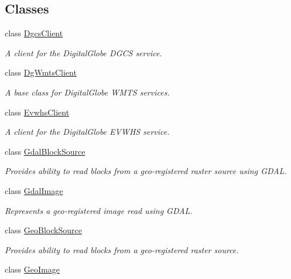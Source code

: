 \subsection*{Classes}
\begin{DoxyCompactItemize}
\item 
class \hyperlink{structdg_1_1deepcore_1_1imagery_1_1_dgcs_client}{Dgcs\+Client}
\begin{DoxyCompactList}\small\item\em A client for the Digital\+Globe D\+G\+CS service. \end{DoxyCompactList}\item 
class \hyperlink{classdg_1_1deepcore_1_1imagery_1_1_dg_wmts_client}{Dg\+Wmts\+Client}
\begin{DoxyCompactList}\small\item\em A base class for Digital\+Globe W\+M\+TS services. \end{DoxyCompactList}\item 
class \hyperlink{structdg_1_1deepcore_1_1imagery_1_1_evwhs_client}{Evwhs\+Client}
\begin{DoxyCompactList}\small\item\em A client for the Digital\+Globe E\+V\+W\+HS service. \end{DoxyCompactList}\item 
class \hyperlink{classdg_1_1deepcore_1_1imagery_1_1_gdal_block_source}{Gdal\+Block\+Source}
\begin{DoxyCompactList}\small\item\em Provides ability to read blocks from a geo-\/registered raster source using G\+D\+AL. \end{DoxyCompactList}\item 
class \hyperlink{classdg_1_1deepcore_1_1imagery_1_1_gdal_image}{Gdal\+Image}
\begin{DoxyCompactList}\small\item\em Represents a geo-\/registered image read using G\+D\+AL. \end{DoxyCompactList}\item 
class \hyperlink{classdg_1_1deepcore_1_1imagery_1_1_geo_block_source}{Geo\+Block\+Source}
\begin{DoxyCompactList}\small\item\em Provides ability to read blocks from a geo-\/registered raster source. \end{DoxyCompactList}\item 
class \hyperlink{classdg_1_1deepcore_1_1imagery_1_1_geo_image}{Geo\+Image}

\end{DoxyCompactItemize}
